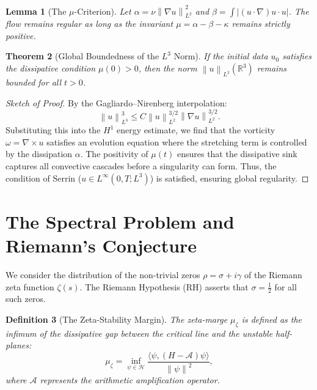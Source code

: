 \documentclass[11pt,a4paper]{amsart}
\newtheorem{theorem}{Theorem}[section]
\newtheorem{lemma}[theorem]{Lemma}
\newtheorem{definition}[theorem]{Definition}
\newcommand{\alphacoeff}{\ensuremath{\alpha}}
\newcommand{\betacoeff}{\ensuremath{\beta}}
\newcommand{\kappacoeff}{\ensuremath{\kappa}}
\newcommand{\mumargin}{\ensuremath{\mu}}
\newcommand{\norm}[1]{\left\|#1\right\|}
\begin{document}
\begin{lemma}[The $\mumargin$-Criterion]
Let $\alphacoeff = \nu \norm{\nabla u}_{L^2}^2$ and $\betacoeff = \int |(u \cdot \nabla)u \cdot u|$.
The flow remains regular as long as the invariant $\mumargin = \alphacoeff - \betacoeff - \kappacoeff$
remains strictly positive.
\end{lemma}

\begin{theorem}[Global Boundedness of the $L^3$ Norm]
If the initial data $u_0$ satisfies the dissipative condition $\mumargin(0) > 0$,
then the norm $\norm{u}_{L^3}(\mathbb{R}^3)$ remains bounded for all $t > 0$.
\end{theorem}

\begin{proof}[Sketch of Proof]
By the Gagliardo--Nirenberg interpolation:
\begin{equation}
    \norm{u}_{L^3}^3 \le C \norm{u}_{L^2}^{3/2} \norm{\nabla u}_{L^2}^{3/2}.
\end{equation}
Substituting this into the $H^1$ energy estimate, we find that the
vorticity $\omega = \nabla \times u$ satisfies an evolution equation
where the stretching term is controlled by the dissipation
$\alphacoeff$. The positivity of $\mumargin(t)$ ensures that the
dissipative sink captures all convective cascades before a singularity
can form. Thus, the condition of Serrin ($u \in L^{\infty}(0, T; L^3)$)
is satisfied, ensuring global regularity.
\end{proof}

\section{The Spectral Problem and Riemann's Conjecture}
We consider the distribution of the non-trivial zeros $\rho = \sigma + i\gamma$
of the Riemann zeta function $\zeta(s)$. The Riemann Hypothesis
(RH) asserts that $\sigma = \tfrac{1}{2}$ for all such zeros.

\begin{definition}[The Zeta-Stability Margin]
The zeta-marge $\mumargin_{\zeta}$ is defined as the infimum of the
dissipative gap between the critical line and the unstable half-planes:
\begin{equation}
    \mumargin_{\zeta} = \inf_{\psi \in \mathcal{H}} \frac{\langle \psi, (H - \mathscr{A})\psi \rangle}{\norm{\psi}^2},
\end{equation}
where $\mathscr{A}$ represents the arithmetic amplification operator.
\end{definition}
\end{document}
